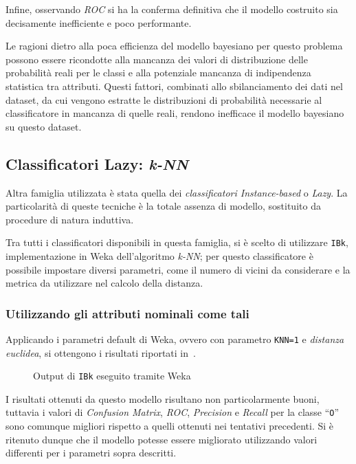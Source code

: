 Infine, osservando \emph{ROC} si ha la conferma definitiva che il modello costruito sia decisamente inefficiente e poco performante.

Le ragioni dietro alla poca efficienza del modello bayesiano per questo problema possono essere ricondotte alla mancanza dei valori di distribuzione delle probabilità reali per le classi e alla potenziale mancanza di indipendenza statistica tra attributi.
Questi fattori, combinati allo sbilanciamento dei dati nel dataset, da cui vengono estratte le distribuzioni di probabilità necessarie al classificatore in mancanza di quelle reali, rendono inefficace il modello bayesiano su questo dataset.

\subsection{Classificatori Lazy: \emph{k-NN}}\label{subsec:ibk}

Altra famiglia utilizzata è stata quella dei \emph{classificatori Instance-based} o \emph{Lazy}.
La particolarità di queste tecniche è la totale assenza di modello, sostituito da procedure di natura induttiva.

Tra tutti i classificatori disponibili in questa famiglia, si è scelto di utilizzare \texttt{IBk}, implementazione in Weka dell'algoritmo \emph{k-NN};
per questo classificatore è possibile impostare diversi parametri, come il numero di vicini da considerare e la metrica da utilizzare nel calcolo della distanza.

\subsubsection{Utilizzando gli attributi nominali come tali}\label{subsub:ibk:nominal}

Applicando i parametri default di Weka, ovvero con parametro \texttt{KNN=1} e \emph{distanza euclidea}, si ottengono i risultati riportati in~.

\begin{figure}[H]
  \centering
  \caption{Output di \texttt{IBk} eseguito tramite Weka}%
  \label{fig:ibk:1}
\end{figure}

I risultati ottenuti da questo modello risultano non particolarmente buoni, tuttavia i valori di \emph{Confusion Matrix}, \emph{ROC}, \emph{Precision} e \emph{Recall} per la classe ``\texttt{O}'' sono comunque migliori rispetto a quelli ottenuti nei tentativi precedenti.
Si è ritenuto dunque che il modello potesse essere migliorato utilizzando valori differenti per i parametri sopra descritti.

